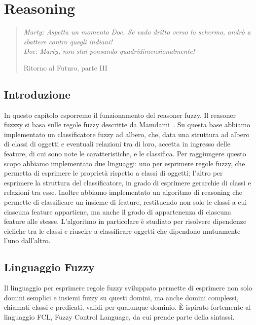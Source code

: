 \chapter{Reasoning}
\label{cap:reasoning}
\thispagestyle{empty}

\begin{quotation}
{\footnotesize
\noindent \emph{Marty: Aspetta un momento Doc. Se vado dritto verso lo schermo, andrò a sbattere contro quegli indiani! \\
Doc: Marty, non stai pensando quadridimensionalmente!}
\begin{flushright}
Ritorno al Futuro, parte III
\end{flushright}
}
\end{quotation}
\vspace{0.5cm}

\section{Introduzione}

In questo capitolo esporremo il funzionamento del reasoner fuzzy. Il reasoner fuzzzy si basa sulle regole fuzzy descritte da Mamdami~\cite{mamdani1975experiment}. 
Su questa base abbiamo implementato un classificatore fuzzy ad albero, che, data una struttura ad albero di classi di oggetti e eventuali relazioni tra di loro, accetta in ingresso delle feature, di cui sono note le caratteristiche, e le classifica.
Per raggiungere questo scopo abbiamo implementato due linguaggi: uno per esprimere regole fuzzy, che permetta di esprimere le proprietà rispetto a classi di oggetti; l'altro per esprimere la struttura del classificatore, in grado di esprimere gerarchie di classi e relazioni tra esse.
Inoltre abbiamo implementato un algoritmo di reasoning che permette di classificare un insieme di feature, restituendo non solo le classi a cui ciascuna feature appartiene, ma anche il grado di appartenenza di ciascuna feature alle stesse.
L'algoritmo in particolare è studiato per risolvere dipendenze cicliche tra le classi e riuscire a classificare oggetti che dipendono mutuamente l'uno dall'altro.

\section{Linguaggio Fuzzy}
Il linguaggio per esprimere regole fuzzy sviluppato permette di esprimere non solo domini semplici e insiemi fuzzy su questi domini, ma anche domini complessi, chiamati classi e predicati, validi per qualunque dominio. \`E ispirato fortemente al linguaggio FCL, Fuzzy Control Language, da cui prende parte della sintassi.

